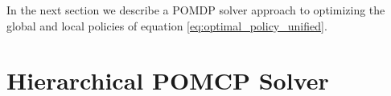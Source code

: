 \documentclass{article}
\newcommand{\ph}[1]{{\textbf{#1}:}} %
\begin{document}



In the next section we describe a POMDP solver approach to optimizing the global and local policies of equation \ref{eq:optimal_policy_unified}.







\section{Hierarchical POMCP Solver}
\end{document}
